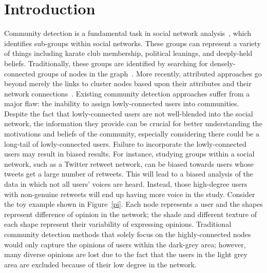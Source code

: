 \vspace{-1pt}
\section{Introduction}
Community detection is a fundamental task in social network analysis~\cite{tang2010community}, which identifies sub-groups within social networks. These groups can represent a variety of things including karate club membership, political leanings, and deeply-held beliefs. Traditionally, these groups are identified by searching for densely-connected groups of nodes in the graph~\cite{malliaros2013clustering}. More recently, attributed approaches go beyond merely the links to cluster nodes based upon their attributes and their network connections~\cite{ruan2013efficient}. Existing community detection approaches suffer from a major flaw: the inability to assign lowly-connected users into communities. Despite the fact that lowly-connected users are not well-blended into the social network, the information they provide can be crucial for better understanding the motivations and beliefs of the community, especially considering there could be a long-tail of lowly-connected users. Failure to incorporate the lowly-connected users may result in biased results. For instance, studying groups within a social network, such as a Twitter retweet network, can be biased towards users whose tweets get a large number of retweets. This will lead to a biased analysis of the data in which not all users' voices are heard. Instead, those high-degree users with non-genuine retweets will end up having more voice in the study. Consider the toy example shown in Figure~\ref{pi}. Each node represents a user and the shapes represent difference of opinion in the network; the shade and different texture of each shape represent their variability of expressing opinions. Traditional community detection methods that solely focus on the highly-connected nodes would only capture the opinions of users within the dark-grey area; however, many diverse opinions are lost due to the fact that the users in the light grey area are excluded because of their low degree in the network.

